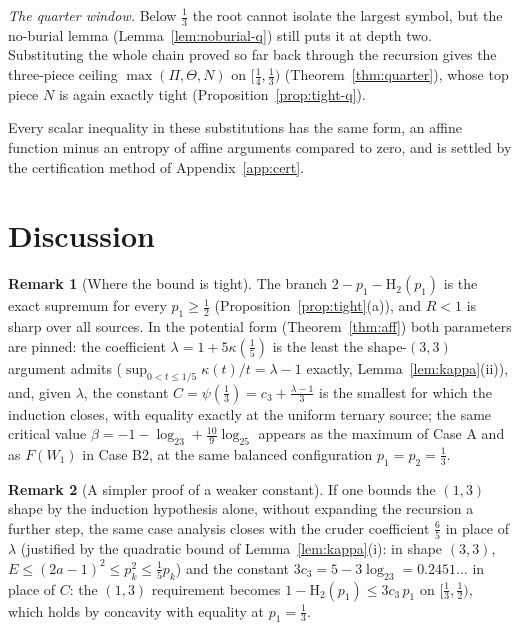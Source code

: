 \documentclass[journal]{IEEEtran}
\theoremstyle{definition}
\newtheorem{remark}{Remark}
\newcommand{\Hh}{\mathrm H_2}
\newcommand{\kp}{\kappa}
\newcommand{\lgg}{\log_2}
\newcommand{\CC}{C}
\newcommand{\lam}{\lambda}
\newcommand{\cthree}{c_3}
\begin{document}
\emph{The quarter window.} Below $\tfrac13$ the root cannot isolate the largest
symbol, but the no-burial lemma (Lemma~\ref{lem:noburial-q}) still puts it at
depth two. Substituting the whole chain proved so far back through the recursion
gives the three-piece ceiling $\max(\Pi,\Theta,N)$ on $[\tfrac14,\tfrac13)$
(Theorem~\ref{thm:quarter}), whose top piece $N$ is again exactly tight
(Proposition~\ref{prop:tight-q}).

Every scalar inequality in these substitutions has the same form, an affine
function minus an entropy of affine arguments compared to zero, and is settled
by the certification method of Appendix~\ref{app:cert}.

\begin{figure}[omitted: a diagram of this paper's results, not reproduced here]\label{fig:dep}\end{figure}

\section{Discussion}\label{sec:disc}

\begin{remark}[Where the bound is tight]\label{rem:where}
The branch $2-p_1-\Hh(p_1)$ is the exact supremum for every $p_1\ge\tfrac12$
(Proposition~\ref{prop:tight}(a)), and $R<1$ is sharp over all sources. In the
potential form (Theorem~\ref{thm:aff}) both parameters are pinned: the
coefficient $\lam=1+5\kp(\tfrac15)$ is the least the shape-$(3,3)$ argument
admits ($\sup_{0<t\le1/5}\kp(t)/t=\lam-1$ exactly,
Lemma~\ref{lem:kappa}(ii)), and, given $\lam$, the constant
$\CC=\psi(\tfrac13)=\cthree+\tfrac{\lam-1}3$ is the smallest for
which the induction closes, with equality exactly at the uniform ternary
source; the same critical value $\beta=-1-\lgg3+\tfrac{10}9\lgg5$ appears as
the maximum of Case A and as $F(W_1)$ in Case B2, at the same balanced
configuration $p_1=p_2=\tfrac13$.
\end{remark}

\begin{remark}[A simpler proof of a weaker constant]\label{rem:simple}
If one bounds the $(1,3)$ shape by the induction hypothesis alone, without
expanding the recursion a further step, the same case analysis closes with the cruder coefficient
$\tfrac65$ in place of $\lam$ (justified by the quadratic bound of
Lemma~\ref{lem:kappa}(i): in shape $(3,3)$,
$E\le(2a-1)^2\le p_k^2\le\tfrac15p_k$) and the constant
$3\cthree=5-3\lgg3=0.2451\ldots$ in place of $\CC$: the $(1,3)$ requirement
becomes $1-\Hh(p_1)\le3\cthree\,p_1$ on $[\tfrac13,\tfrac12)$, which holds by
concavity with equality at $p_1=\tfrac13$.
\end{remark}
\end{document}
